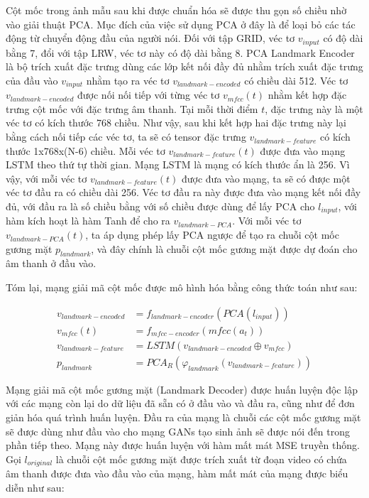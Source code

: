 Cột mốc trong ảnh mẫu sau khi được chuẩn hóa sẽ được thu gọn số chiều nhờ vào giải thuật PCA. Mục đích của việc sử dụng PCA ở đây là để loại bỏ các tác động từ chuyển động đầu của người nói. Đối với tập GRID, véc tơ $v_{input}$ có độ dài bằng 7, đổi với tập LRW, véc tơ này có độ dài bằng 8. PCA Landmark Encoder là bộ trích xuất đặc trưng dùng các lớp kết nối đầy đủ nhằm trích xuất đặc trưng của đầu vào $v_{input}$ nhằm tạo ra véc tơ $v_{landmark-encoded}$ có chiều dài 512. Véc tơ $v_{landmark-encoded}$ được nối nối tiếp với từng véc tơ $v_{mfcc}(t)$ nhằm kết hợp đặc trưng cột mốc với đặc trưng âm thanh. Tại mỗi thời điểm $t$, đặc trưng này là một véc tơ có kích thước 768 chiều. Như vậy, sau khi kết hợp hai đặc trưng này lại bằng cách nối tiếp các véc tơ, ta sẽ có tensor đặc trưng $v_{landmark-feature}$ có kích thước 1x768x(N-6) chiều. Mỗi véc tơ $v_{landmark-feature}(t)$ được đưa vào mạng LSTM theo thứ tự thời gian. Mạng LSTM là mạng có kích thước ẩn là 256. Vì vậy, với mỗi véc tơ $v_{landmark-feature}(t)$ được đưa vào mạng, ta sẽ có được một véc tơ đầu ra có chiều dài 256. Véc tơ đầu ra này được đưa vào mạng kết nối đầy đủ, với đầu ra là số chiều bằng với số chiều được dùng để lấy PCA cho $l_{input}$, với hàm kích hoạt là hàm Tanh để cho ra $v_{landmark-PCA}$. Với mỗi véc tơ $v_{landmark-PCA}(t)$, ta áp dụng phép lấy PCA ngược để tạo ra chuỗi cột mốc gương mặt $p_{landmark}$, và đây chính là chuỗi cột mốc gương mặt được dự đoán cho âm thanh ở đầu vào.

Tóm lại, mạng giải mã cột mốc được mô hình hóa bằng công thức toán như sau:

\begin{equation}
    \begin{split}
    v_{landmark-encoded} &= f_{landmark-encoder}(PCA(l_{input}))\\
    v_{mfcc}(t) &= f_{mfcc-encoder}(mfcc(a_t))\\
    v_{landmark-feature} &= LSTM(v_{landmark-encoded} \oplus v_{mfcc})\\
    p_{landmark} &= PCA_R(\varphi_{landmark}(v_{landmark-feature}))
    \end{split}
\end{equation}

Mạng giải mã cột mốc gương mặt (Landmark Decoder) được huấn luyện độc lập với các mạng còn lại do dữ liệu đã sẵn có ở đầu vào và đầu ra, cũng như để đơn giản hóa quá trình huấn luyện. Đầu ra của mạng là chuỗi các cột mốc gương mặt sẽ được dùng như đầu vào cho mạng GANs tạo sinh ảnh sẽ được nói đến trong phần tiếp theo. Mạng này được huấn luyện với hàm mất mát MSE truyền thống. Gọi $l_{original}$ là chuỗi cột mốc gương mặt được trích xuất từ đoạn video có chứa âm thanh được đưa vào đầu vào của mạng, hàm mất mát của mạng được biểu diễn như sau:

